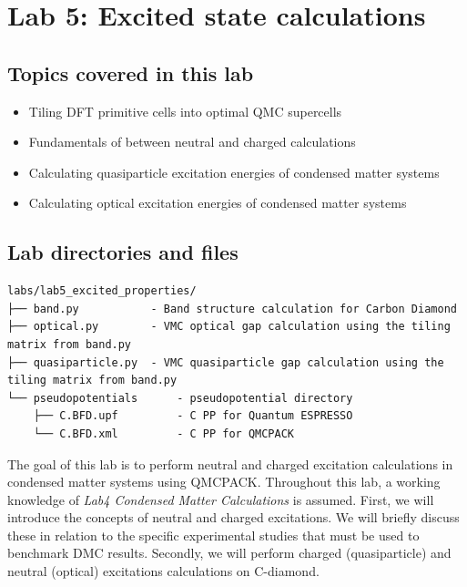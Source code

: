 \chapter{Lab 5: Excited state calculations}
\label{chap:excited}


\section{Topics covered in this lab}
\begin{itemize}
	\item{Tiling DFT primitive cells into optimal QMC supercells}
	\item{Fundamentals of  between neutral and charged calculations}
	\item{Calculating quasiparticle excitation energies of condensed matter systems}
	\item{Calculating optical excitation energies of condensed matter systems}
\end{itemize}

\section{Lab directories and files}

\begin{verbatim}
labs/lab5_excited_properties/
├── band.py           - Band structure calculation for Carbon Diamond
├── optical.py        - VMC optical gap calculation using the tiling matrix from band.py
├── quasiparticle.py  - VMC quasiparticle gap calculation using the tiling matrix from band.py
└── pseudopotentials      - pseudopotential directory
    ├── C.BFD.upf         - C PP for Quantum ESPRESSO
    └── C.BFD.xml         - C PP for QMCPACK
\end{verbatim}

The goal of this lab is to perform neutral and charged excitation calculations in condensed matter systems using QMCPACK. 
Throughout this lab, a working knowledge of \textit{Lab4 Condensed Matter Calculations} is assumed. 
First, we will introduce the concepts of neutral and charged excitations. 
We will briefly discuss these in relation to the specific experimental studies that must be used to benchmark DMC results. 
Secondly, we will perform charged (quasiparticle) and neutral (optical) excitations calculations on C-diamond.


